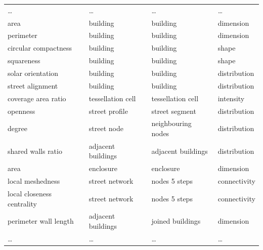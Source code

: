 \begin{small}
\begin{longtable}{p{5cm}p{4cm}p{4cm}l}
\bottomrule
\endlastfoot
\dots &                        \dots &                   \dots &    \dots \\
                                area &                        building &                   building &    dimension \\
                           perimeter &                        building &                   building &    dimension \\
                circular compactness &                        building &                   building &        shape \\
                          squareness &                        building &                   building &        shape \\
                   solar orientation &                        building &                   building & distribution \\
                    street alignment &                        building &                   building & distribution \\
                 coverage area ratio &               tessellation cell &          tessellation cell &    intensity \\
                            openness &                  street profile &             street segment & distribution \\
                              degree &                     street node &         neighbouring nodes & distribution \\
                  shared walls ratio &             adjacent buildings  &        adjacent buildings  & distribution \\
                                area &                       enclosure &                  enclosure &    dimension \\
                    local meshedness &                  street network &              nodes 5 steps & connectivity \\
          local closeness centrality &                  street network &              nodes 5 steps & connectivity \\
               perimeter wall length &             adjacent buildings  &           joined buildings &    dimension \\
               \dots &                        \dots &                   \dots &    \dots \\
\end{longtable}
\end{small}



